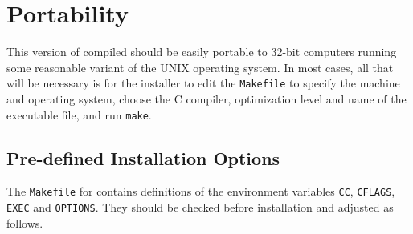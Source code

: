 \section{Portability}

This version of compiled \CLPR{} should be easily portable to 32-bit 
computers running some reasonable variant of the UNIX operating system.
In most cases, all that will be necessary is for the installer to edit the
{\tt Makefile} to specify the machine and operating system, choose the C 
compiler, optimization level and name of the \CLPR{} executable file, and
run {\tt make}. 

\subsection{Pre-defined Installation Options}

The {\tt Makefile} for \CLPR{} contains definitions of the environment 
variables {\tt CC}, {\tt CFLAGS}, {\tt EXEC} and {\tt OPTIONS}. They
should be checked before installation and adjusted as follows. 

